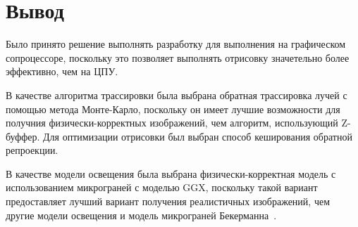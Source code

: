 \section{Вывод}

Было принято решение выполнять разработку для выполнения на графическом сопроцессоре,
поскольку это позволяет выполнять отрисовку значетельно более эффективно, чем на ЦПУ.

В качестве алгоритма трассировки была выбрана обратная трассировка лучей с помощью
метода Монте-Карло, поскольку он имеет
лучшие возможности для получния физически-корректных изображений, чем 
алгоритм, использующий Z-буффер.
Для оптимизации отрисовки был выбран способ кеширования 
обратной репроекции.

В качестве модели освещения была выбрана физически-корректная модель с использованием
микрограней с моделью GGX, поскольку такой вариант предоставляет лучший вариант
получения реалистичных изображений, чем другие модели освещения и модель микрограней Бекерманна~\cite{MMfRtRS}.
